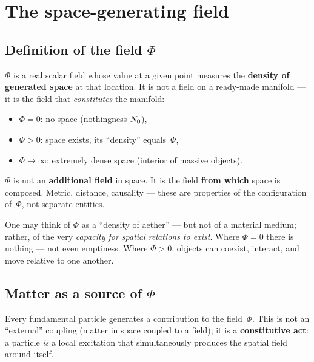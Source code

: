 \section{The space-generating field}\label{sec:pole}

\subsection{Definition of the field $\Phi$}

\begin{definition}\label{def:Phi}
$\Phi$ is a real scalar field whose value at a given point measures
the \textbf{density of generated space} at that location.  It is not
a field on a ready-made manifold --- it is the field that
\emph{constitutes} the manifold:
\begin{itemize}[nosep]
  \item $\Phi = 0$: no space (nothingness $N_0$),
  \item $\Phi > 0$: space exists, its ``density'' equals~$\Phi$,
  \item $\Phi \to \infty$: extremely dense space
        (interior of massive objects).
\end{itemize}
\end{definition}

$\Phi$ is not an \textbf{additional field} in space.
It is the field \textbf{from which} space is composed.
Metric, distance, causality --- these are properties of the
configuration of~$\Phi$, not separate entities.

\begin{remark}
One may think of $\Phi$ as a ``density of aether'' --- but not of a
material medium; rather, of the very \emph{capacity for spatial
relations to exist}.  Where $\Phi = 0$ there is nothing --- not even
emptiness.  Where $\Phi > 0$, objects can coexist, interact, and move
relative to one another.
\end{remark}

\subsection{Matter as a source of $\Phi$}\label{ssec:zrodla}

Every fundamental particle generates a contribution to the
field~$\Phi$.  This is not an ``external'' coupling (matter in space
coupled to a field); it is a \textbf{constitutive act}: a particle
\emph{is} a local excitation that simultaneously produces the spatial
field around itself.

